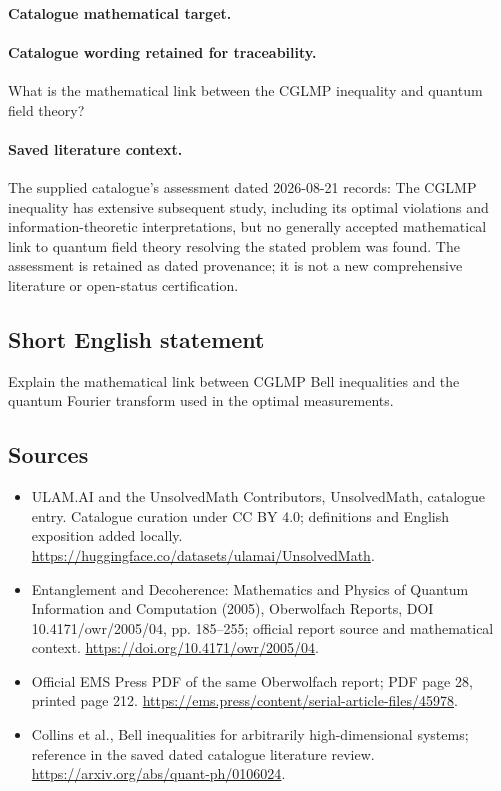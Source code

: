 \documentclass[11pt]{article}
\begin{document}
\paragraph{Catalogue mathematical target.}
\paragraph{Catalogue wording retained for traceability.}
What is the mathematical link between the CGLMP inequality and quantum field theory?

\paragraph{Saved literature context.} The supplied catalogue's assessment dated 2026-08-21 records: The CGLMP inequality has extensive subsequent study, including its optimal violations and information-theoretic interpretations, but no generally accepted mathematical link to quantum field theory resolving the stated problem was found. The assessment is retained as dated provenance; it is not a new comprehensive literature or open-status certification.
\subsection{Short English statement}
Explain the mathematical link between CGLMP Bell inequalities and the quantum Fourier transform used in the optimal measurements.
\subsection{Sources}
\begin{itemize}
\item[\hypertarget{source:statement:1}{S1}] ULAM.AI and the UnsolvedMath Contributors, UnsolvedMath, catalogue entry. Catalogue curation under CC BY 4.0; definitions and English exposition added locally.
\url{https://huggingface.co/datasets/ulamai/UnsolvedMath}.
\item[\hypertarget{source:statement:2}{S2}] Entanglement and Decoherence: Mathematics and Physics of Quantum Information and Computation (2005), Oberwolfach Reports, DOI 10.4171/owr/2005/04, pp. 185--255; official report source and mathematical context.
\url{https://doi.org/10.4171/owr/2005/04}.
\item[\hypertarget{source:statement:3}{S3}] Official EMS Press PDF of the same Oberwolfach report; PDF page 28, printed page 212.
\url{https://ems.press/content/serial-article-files/45978}.
\item[\hypertarget{source:statement:4}{S4}] Collins et al., Bell inequalities for arbitrarily high-dimensional systems; reference in the saved dated catalogue literature review.
\url{https://arxiv.org/abs/quant-ph/0106024}.
\end{itemize}
\label{end:statement}
\end{document}
